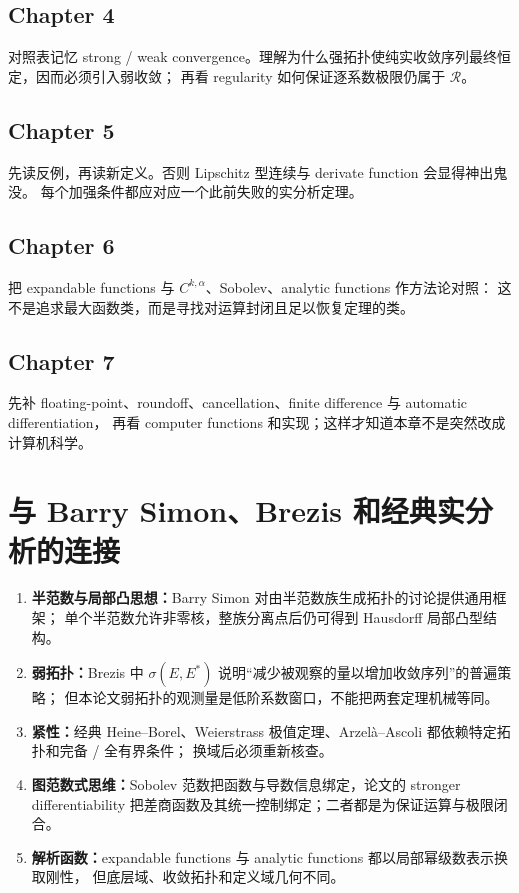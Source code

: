 \documentclass[11pt,a4paper]{article}
\theoremstyle{remark}
\newcommand{\LC}{\mathcal R}
\begin{document}
\subsection*{Chapter 4}
对照表记忆 strong / weak convergence。理解为什么强拓扑使纯实收敛序列最终恒定，因而必须引入弱收敛；
再看 regularity 如何保证逐系数极限仍属于 $\LC$。

\subsection*{Chapter 5}
先读反例，再读新定义。否则 Lipschitz 型连续与 derivate function 会显得神出鬼没。
每个加强条件都应对应一个此前失败的实分析定理。

\subsection*{Chapter 6}
把 expandable functions 与 $C^{k,\alpha}$、Sobolev、analytic functions 作方法论对照：
这不是追求最大函数类，而是寻找对运算封闭且足以恢复定理的类。

\subsection*{Chapter 7}
先补 floating-point、roundoff、cancellation、finite difference 与 automatic differentiation，
再看 computer functions 和实现；这样才知道本章不是突然改成计算机科学。

\section{与 Barry Simon、Brezis 和经典实分析的连接}

\begin{enumerate}
\item \textbf{半范数与局部凸思想：}Barry Simon 对由半范数族生成拓扑的讨论提供通用框架；
单个半范数允许非零核，整族分离点后仍可得到 Hausdorff 局部凸型结构。
\item \textbf{弱拓扑：}Brezis 中 $\sigma(E,E^*)$ 说明“减少被观察的量以增加收敛序列”的普遍策略；
但本论文弱拓扑的观测量是低阶系数窗口，不能把两套定理机械等同。
\item \textbf{紧性：}经典 Heine--Borel、Weierstrass 极值定理、Arzel\`a--Ascoli 都依赖特定拓扑和完备 / 全有界条件；
换域后必须重新核查。
\item \textbf{图范数式思维：}Sobolev 范数把函数与导数信息绑定，论文的 stronger differentiability
把差商函数及其统一控制绑定；二者都是为保证运算与极限闭合。
\item \textbf{解析函数：}expandable functions 与 analytic functions 都以局部幂级数表示换取刚性，
但底层域、收敛拓扑和定义域几何不同。
\end{enumerate}
\end{document}
